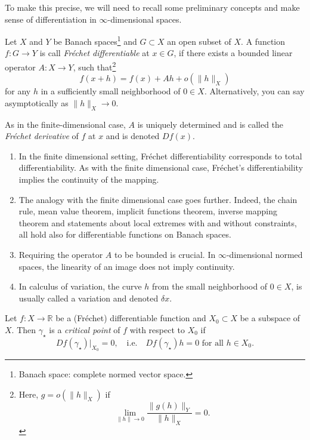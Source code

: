 \documentclass[english,fontsize=11pt,paper=a5,oneside]{scrbook}
\newcommand{\R}{\mathbb{R}}
\theoremstyle{definition}
\newenvironment{remark}
  {\pushQED{\qed}\renewcommand{\qedsymbol}{$\lozenge$}\remarkx}
  {\popQED\endremarkx}
\begin{document}
To make this precise, we will need to recall some preliminary concepts and make sense of differentiation in $\infty$-dimensional spaces.

Let $X$ and $Y$ be Banach spaces\footnote{Banach space: complete normed vector space.}  and $G\subset X$ an open subset of $X$.
A function $f: G \to Y$ is call \emph{Fr\'echet differentiable} at $x\in G$, if there exists a bounded linear operator $A: X \to Y$, such that\footnote{Here, $g = o(\|h\|_X)$ if
  \begin{equation}
    \lim_{\|h\| \to 0} \frac{\|g(h)\|_Y}{\|h\|_X} = 0.
  \end{equation}
}
\begin{equation}\label{eq:frechetdiff}
  f(x+h) = f(x) + Ah + o(\|h\|_X)
\end{equation}
for any $h$ in a sufficiently small neighborhood of $0\in X$. Alternatively, you can say asymptotically as $\|h\|_X\to 0$.

As in the finite-dimensional case, $A$ is uniquely determined and is called the \emph{Fr\'echet derivative} of $f$ at $x$ and is denoted $D f(x)$.

\begin{remark}
  \begin{enumerate}
    \item In the finite dimensional setting, Fr\'echet differentiability corresponds to total differentiability. As with the finite dimensional case, Fr\'echet's differentiability implies the continuity of the mapping.
    \item The analogy with the finite dimensional case goes further. Indeed, the chain rule, mean value theorem, implicit functions theorem, inverse mapping theorem and statements about local extremes with and without constraints, all hold also for differentiable functions on Banach spaces.
    \item Requiring the operator $A$ to be bounded is crucial. In $\infty$-dimensional normed spaces, the linearity of an image does not imply continuity.
    \item In calculus of variation, the curve $h$ from the small neighborhood of $0\in X$, is usually called a variation and denoted $\delta x$.
  \end{enumerate}
\end{remark}

Let $f: X \to \R$ be a (Fr\'echet) differentiable function and $X_0 \subset X$ be a subspace of $X$. Then $\gamma_\star$ is a \emph{critical point} of $f$ with respect to $X_0$ if
\begin{equation}
  Df(\gamma_\star)\Big|_{X_0} = 0, \quad\mbox{i.e.}\quad
  Df(\gamma_\star)h = 0 \mbox{ for all } h\in X_0.
\end{equation}
\end{document}
